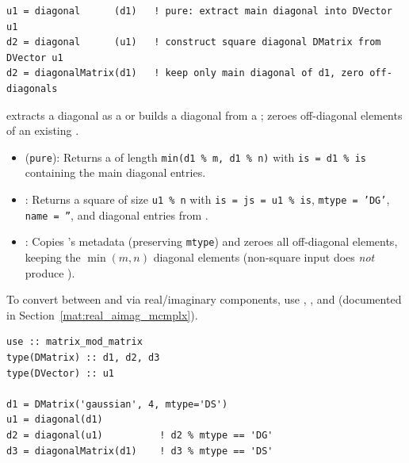 \lstset{language=[95]Fortran}
\begin{lstlisting}
u1 = diagonal      (d1)   ! pure: extract main diagonal into DVector u1
d2 = diagonal      (u1)   ! construct square diagonal DMatrix from DVector u1
d2 = diagonalMatrix(d1)   ! keep only main diagonal of d1, zero off-diagonals
\end{lstlisting}

 extracts a  diagonal as a  or builds a diagonal  from a ;  zeroes off-diagonal elements of an existing .

\begin{itemize}
  \item {} (\texttt{pure}): Returns a  of length \texttt{min(d1 \% m, d1 \% n)} with \texttt{is = d1 \% is} containing the main diagonal entries.
  \item {}: Returns a square  of size \texttt{u1 \% n} with \texttt{is = js = u1 \% is}, \texttt{mtype = 'DG'}, \texttt{name = ''}, and diagonal entries from .
  \item {}: Copies 's metadata (preserving \texttt{mtype}) and zeroes all off-diagonal elements, keeping the $\min(m,n)$ diagonal elements (non-square input does \emph{not} produce ).
\end{itemize}
To convert between  and  via real/imaginary components, use , , and  (documented in Section~\ref{mat:real_aimag_mcmplx}).

\begin{description}[leftmargin=2.2cm, style=nextline]
\end{description}

\lstset{language=[95]Fortran}
\begin{lstlisting}
use :: matrix_mod_matrix
type(DMatrix) :: d1, d2, d3
type(DVector) :: u1

d1 = DMatrix('gaussian', 4, mtype='DS')
u1 = diagonal(d1)
d2 = diagonal(u1)          ! d2 % mtype == 'DG'
d3 = diagonalMatrix(d1)    ! d3 % mtype == 'DS'
\end{lstlisting}

